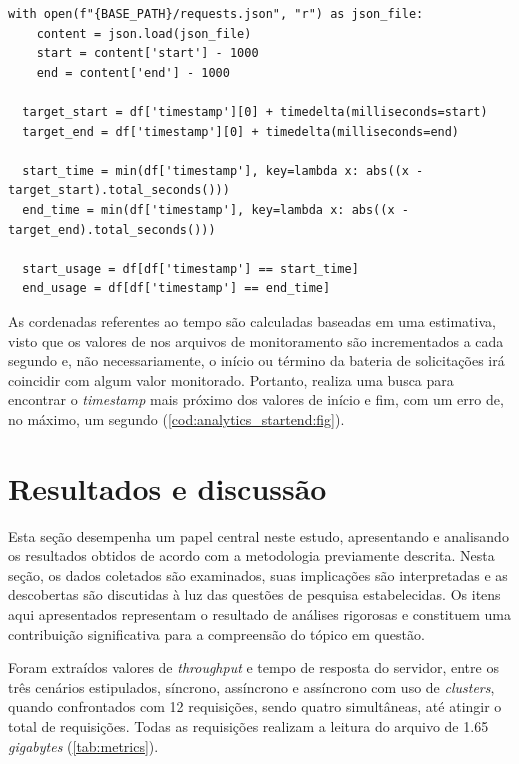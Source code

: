 \documentclass[12pt]{article}
\begin{document}
\begin{lstlisting}[caption={Recuperação das coordenadas de início e fim da bateria de solicitações.}, label=cod:analytics_startend:fig]
  with open(f"{BASE_PATH}/requests.json", "r") as json_file:
    content = json.load(json_file)
    start = content['start'] - 1000
    end = content['end'] - 1000

  target_start = df['timestamp'][0] + timedelta(milliseconds=start)
  target_end = df['timestamp'][0] + timedelta(milliseconds=end)

  start_time = min(df['timestamp'], key=lambda x: abs((x - target_start).total_seconds()))
  end_time = min(df['timestamp'], key=lambda x: abs((x - target_end).total_seconds()))

  start_usage = df[df['timestamp'] == start_time]
  end_usage = df[df['timestamp'] == end_time]
\end{lstlisting}

As cordenadas referentes ao tempo são calculadas baseadas em uma estimativa, visto que os valores de 
nos arquivos de monitoramento são incrementados a cada segundo e, não necessariamente, o início ou término da bateria de 
solicitações irá coincidir com algum valor monitorado. Portanto, realiza uma busca
para encontrar o \textit{timestamp} mais próximo dos valores de início e fim, com um erro de, no máximo, um segundo (\autoref{cod:analytics_startend:fig}).

\section{Resultados e discussão}

Esta seção desempenha um papel central neste estudo, apresentando e analisando os resultados obtidos de 
acordo com a metodologia previamente descrita. Nesta seção, os dados coletados são examinados, suas implicações são interpretadas 
e as descobertas são discutidas à luz das questões de pesquisa estabelecidas. Os itens aqui apresentados representam o 
resultado de análises rigorosas e constituem uma contribuição significativa para a compreensão do tópico em questão.

Foram extraídos valores de \textit{throughput} e tempo de resposta do servidor,
entre os três cenários estipulados, síncrono, assíncrono e assíncrono com uso de \textit{clusters}, quando confrontados
com 12 requisições, sendo quatro simultâneas, até atingir o total de requisições. Todas as requisições realizam a leitura
do arquivo de 1.65 \textit{gigabytes} (\autoref{tab:metrics}). 
\end{document}
